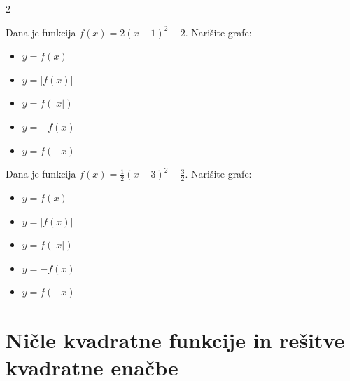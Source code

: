         \begin{multicols}{2}
    
            \begin{naloga}
                Dana je funkcija $f(x)=2\left(x-1\right)^2-2$. Narišite grafe:
                
                    \begin{itemize}
                        \item $ y=f(x) $ 
                        \item $ y=\lvert f(x) \rvert $ 
                        \item $ y=f(|x|) $ 
                        \item $ y=-f(x) $ 
                        \item $ y=f(-x) $ 
                    \end{itemize}

            \end{naloga}

            \begin{naloga}
                Dana je funkcija $f(x)=\frac{1}{2}\left(x-3\right)^2-\frac{3}{2}$. Narišite grafe:
                
                    \begin{itemize}
                        \item $ y=f(x) $ 
                        \item $ y=\lvert f(x) \rvert $ 
                        \item $ y=f(|x|) $ 
                        \item $ y=-f(x) $ 
                        \item $ y=f(-x) $ 
                    \end{itemize}

            \end{naloga}

        \end{multicols}

        
        
    \newpage
    \section{Ničle kvadratne funkcije in rešitve kvadratne enačbe}


\newpage

    

